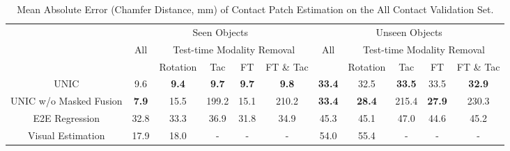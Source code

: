 \documentclass[letterpaper, 10 pt, conference]{ieeeconf}  %
\newcommand{\unic}{\textsc{UNIC}}
\begin{document}
\begin{table}[ttt]
\centering
\caption{Mean Absolute Error (Chamfer Distance, mm) of Contact Patch Estimation on the All Contact Validation Set.}
\label{tab:contact_patch}
\begin{tabular}{|c|ccccc|ccccc|}
\hline
\multirow{3}{*}{} & \multicolumn{5}{c|}{Seen Objects}                                                                                                                               & \multicolumn{5}{c|}{Unseen Objects}                                                \\ \cline{2-11} 
                  & \multicolumn{1}{c|}{\multirow{2}{*}{All}} & \multicolumn{4}{c|}{Test-time Modality Removal}                                                                                              & \multicolumn{1}{c|}{\multirow{2}{*}{All}} & \multicolumn{4}{c|}{Test-time Modality Removal}                 \\ \cline{3-6} \cline{8-11} 
                  & \multicolumn{1}{c|}{}                     & \multicolumn{1}{c|}{Rotation} & \multicolumn{1}{c|}{Tac} & \multicolumn{1}{c|}{FT} & FT \& Tac & \multicolumn{1}{c|}{}                      & Rotation   & Tac   & FT   & FT \& Tac \\ \hline
\unic{}              & \multicolumn{1}{c|}{9.6}                  & \textbf{9.4}            & \textbf{9.7}             & \textbf{9.7}             & \textbf{9.8}     & \multicolumn{1}{c|}{\textbf{33.4}}           & 32.5 & \textbf{33.5} & {33.5} & \textbf{32.9} \\
\unic{} w/o Masked Fusion  & \multicolumn{1}{c|}{\textbf{7.9}}         & 15.5                    & 199.2                    & 15.1                    & 210.2     & \multicolumn{1}{c|}{\textbf{33.4}}         & \textbf{28.4} & 215.4 & \textbf{27.9} & 230.3     \\
E2E Regression    & \multicolumn{1}{c|}{32.8}                 & 33.3                    & 36.9                     & 31.8                    & 34.9      & \multicolumn{1}{c|}{45.3}                  & 45.1 & 47.0 & 44.6 & 45.2 \\ 
Visual Estimation    & \multicolumn{1}{c|}{17.9}                  & 18.0                    & -                    & -                  & -      & \multicolumn{1}{c|}{{54.0}}       & 55.4 & - & - & -\\\hline
\end{tabular}
\end{table}
\end{document}
